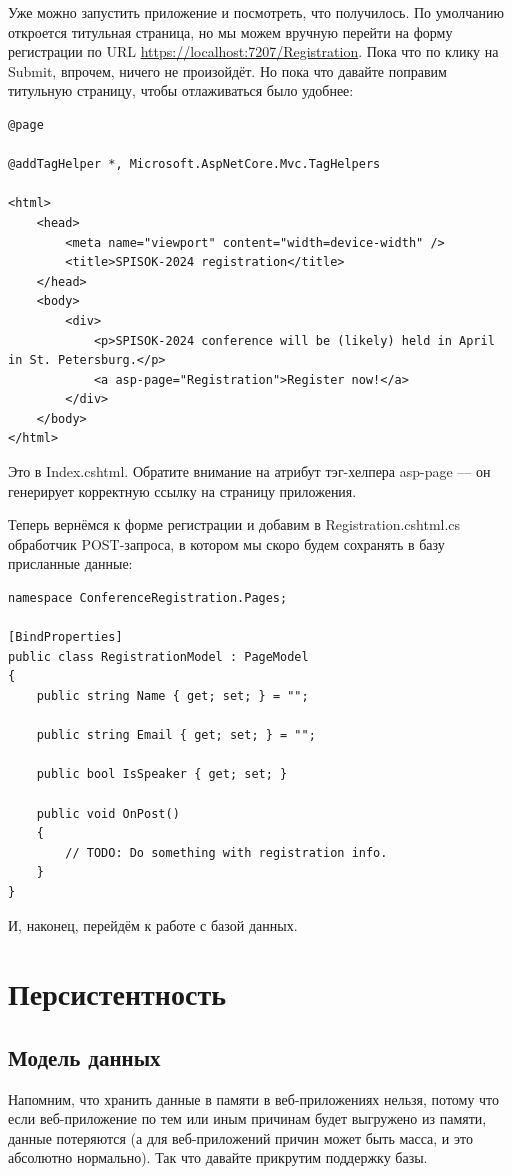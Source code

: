 \documentclass{../../text-style}
\begin{document}
Уже можно запустить приложение и посмотреть, что получилось. По умолчанию откроется титульная страница, но мы можем вручную перейти на форму регистрации по URL \url{https://localhost:7207/Registration}. Пока что по клику на Submit, впрочем, ничего не произойдёт. Но пока что давайте поправим титульную страницу, чтобы отлаживаться было удобнее:

\begin{verbatim}
@page

@addTagHelper *, Microsoft.AspNetCore.Mvc.TagHelpers

<html>
    <head>
        <meta name="viewport" content="width=device-width" />
        <title>SPISOK-2024 registration</title>
    </head>
    <body>
        <div>
            <p>SPISOK-2024 conference will be (likely) held in April in St. Petersburg.</p>
            <a asp-page="Registration">Register now!</a>
        </div>
    </body>
</html>
\end{verbatim}

Это в Index.cshtml. Обратите внимание на атрибут тэг-хелпера asp-page --- он генерирует корректную ссылку на страницу приложения.

Теперь вернёмся к форме регистрации и добавим в Registration.cshtml.cs обработчик POST-запроса, в котором мы скоро будем сохранять в базу присланные данные:

\begin{verbatim}
namespace ConferenceRegistration.Pages;

[BindProperties]
public class RegistrationModel : PageModel
{
    public string Name { get; set; } = "";

    public string Email { get; set; } = "";

    public bool IsSpeaker { get; set; }

    public void OnPost()
    {
        // TODO: Do something with registration info.
    }
}
\end{verbatim}

И, наконец, перейдём к работе с базой данных.

\section{Персистентность}

\subsection{Модель данных}

Напомним, что хранить данные в памяти в веб-приложениях нельзя, потому что если веб-приложение по тем или иным причинам будет выгружено из памяти, данные потеряются (а для веб-приложений причин может быть масса, и это абсолютно нормально). Так что давайте прикрутим поддержку базы. 
\end{document}
